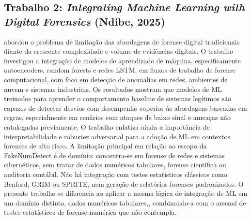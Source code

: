 \documentclass[
    12pt,                %
    openright,           %
    oneside,             %
    a4paper,             %
    english,             %
    brazil               %
]{abntex2}
\begin{document}
\subsection{Trabalho 2: \textit{Integrating Machine Learning with Digital Forensics} (Ndibe, 2025)}
 abordou o problema de limitação das abordagens de forense digital tradicionais diante da crescente complexidade e volume de evidências digitais. O trabalho investigou a integração de modelos de aprendizado de máquina, especificamente autoencoders, random forests e redes LSTM, em fluxos de trabalho de forense computacional, com foco em detecção de anomalias em redes, ambientes de nuvem e sistemas industriais.
Os resultados mostram que modelos de ML treinados para aprender o comportamento baseline de sistemas legítimos são capazes de detectar desvios com desempenho superior às abordagens baseadas em regras, especialmente em cenários com ataques de baixo sinal e ameaças não catalogadas previamente. O trabalho enfatiza ainda a importância de interpretabilidade e robustez adversarial para a adoção de ML em contextos forenses de alto risco.
A limitação principal em relação ao escopo da FakeNumDetect é de domínio:  concentra-se em forense de redes e sistemas cibernéticos, sem tratar de dados numéricos tabulares, forense científica ou auditoria contábil. Não há integração com testes estatísticos clássicos como Benford, GRIM ou SPRITE, nem geração de relatórios forenses padronizados. O presente trabalho se diferencia ao aplicar a mesma lógica de integração de ML em um domínio distinto, dados numéricos tabulares,, combinando-a com o arsenal de testes estatísticos de forense numérica que  não contempla.
\end{document}
